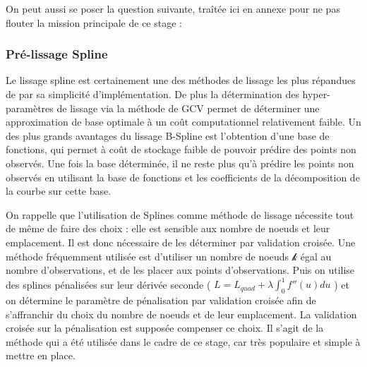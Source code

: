 On peut aussi se poser la question suivante, traîtée ici en annexe pour ne pas flouter la mission principale de ce stage :




\subsubsection{Pré-lissage Spline}

Le lissage spline est certainement une des méthodes de lissage les plus répandues de par sa simplicité d'implémentation. De plus la détermination des hyper-paramètres de lissage via la méthode de GCV permet de déterminer une approximation de base optimale à un coût computationnel relativement faible. Un des plus grands avantages du lissage B-Spline est l'obtention d'une base de fonctions, qui permet à coût de stockage faible de pouvoir prédire des points non observés. Une fois la base déterminée, il ne reste plus qu'à prédire les points non observés en utilisant la base de fonctions et les coefficients de la décomposition de la courbe sur cette base.

\bigskip

On rappelle que l'utilisation de Splines comme méthode de lissage nécessite tout de même de faire des choix : elle est sensible aux nombre de noeuds et leur emplacement. Il est donc nécessaire de les déterminer par validation croisée. Une méthode fréquemment utilisée est d'utiliser un nombre de noeuds $\mathcal k$ égal au nombre d'observations, et de les placer aux points d'observations. Puis on utilise des splines pénalisées sur leur dérivée seconde ( $L = L_{quad} + \lambda \displaystyle\int_0^1 f''(u) du$ ) et on détermine le paramètre de pénalisation par validation croisée afin de s'affranchir du choix du nombre de noeuds et de leur emplacement. La validation croisée sur la pénalisation est supposée compenser ce choix. Il s'agit de la méthode qui a été utilisée dans le cadre de ce stage, car très populaire et simple à mettre en place.

